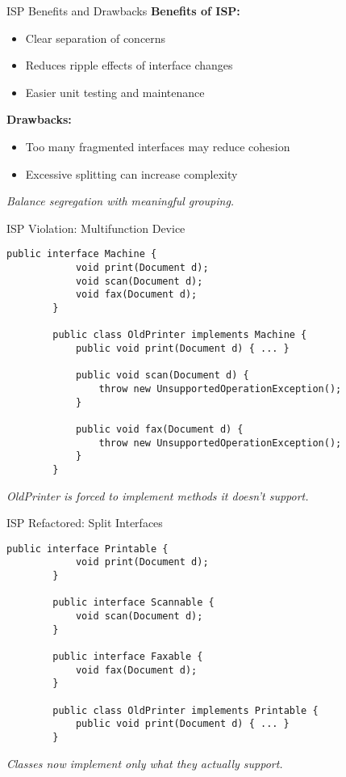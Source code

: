 \documentclass[aspectratio=169, table]{beamer}
\begin{document}
\begin{frame}[fragile]{ISP Benefits and Drawbacks}
	\vspace{20pt}
	\textbf{Benefits of ISP:}
	\begin{itemize}
		\item Clear separation of concerns
		\item Reduces ripple effects of interface changes
		\item Easier unit testing and maintenance
	\end{itemize}
	
	\textbf{Drawbacks:}
	\begin{itemize}
		\item Too many fragmented interfaces may reduce cohesion
		\item Excessive splitting can increase complexity
	\end{itemize}
	
	\textit{Balance segregation with meaningful grouping.}
\end{frame}

\begin{frame}[fragile]{ISP Violation: Multifunction Device}
	\vspace{20pt}
	\begin{lstlisting}[style=JavaStyle]
		public interface Machine {
			void print(Document d);
			void scan(Document d);
			void fax(Document d);
		}
		
		public class OldPrinter implements Machine {
			public void print(Document d) { ... }
			
			public void scan(Document d) {
				throw new UnsupportedOperationException();
			}
			
			public void fax(Document d) {
				throw new UnsupportedOperationException();
			}
		}
	\end{lstlisting}
	\textit{OldPrinter is forced to implement methods it doesn’t support.}
\end{frame}

\begin{frame}[fragile]{ISP Refactored: Split Interfaces}
	\vspace{20pt}
	\begin{lstlisting}[style=JavaStyle]
		public interface Printable {
			void print(Document d);
		}
		
		public interface Scannable {
			void scan(Document d);
		}
		
		public interface Faxable {
			void fax(Document d);
		}
		
		public class OldPrinter implements Printable {
			public void print(Document d) { ... }
		}
	\end{lstlisting}
	\textit{Classes now implement only what they actually support.}
\end{frame}
\end{document}
